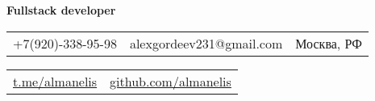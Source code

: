 \newcommand*{\customcventry}[7][.13em]{
\begin{tabular}{@{}l}
{\bfseries #4} \
{\itshape #3}
\end{tabular}
\hfill
\begin{tabular}{l@{}}
{\bfseries #5} \
{\itshape #2}
\end{tabular}
\ifx&#7&%
\else{\
\begin{minipage}{\maincolumnwidth}%
\small#7%
\end{minipage}}\fi%
\par\addvspace{#1}}
\makecvtitle
\vspace*{-12mm}
\begin{center}\textbf{Fullstack developer}\end{center}

\begin{center}
\begin{tabular}{ c c c }
\faMobile\enspace +7(920)-338-95-98 & \enspace alexgordeev231@gmail.com & \enspace \faHome\enspace Москва, РФ \\
\end{tabular}
\end{center}

\begin{center}
\begin{tabular}{c c}
\faTelegram\enspace \color{blue} \href{https://www.t.me/almanelis}{t.me/almanelis} & \enspace
\faGithub\enspace \color{blue} \href{https://github.com/almanelis}{github.com/almanelis}
\end{tabular}
\end{center}